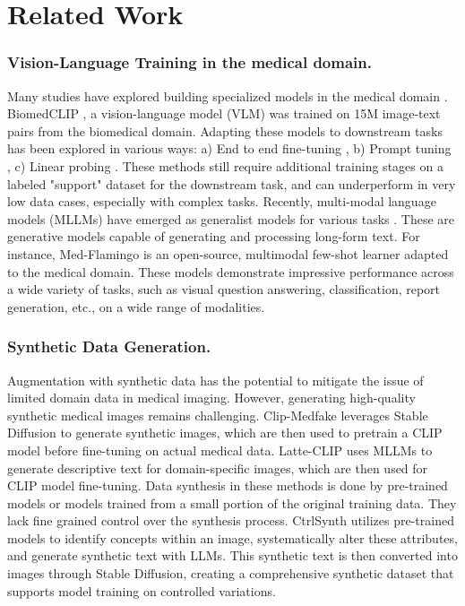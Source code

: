 \section{Related Work}
\subsubsection{Vision-Language Training in the medical domain.}
Many studies have explored building specialized models in the medical domain \cite{convirt, wang2022medclip, zhang2024mediclip}. BiomedCLIP \cite{zhang2023biomedclip}, a vision-language model (VLM) was trained on 15M image-text pairs from the biomedical domain. Adapting these models to downstream tasks has been explored in various ways: a) End to end fine-tuning \cite{convirt, ikezogwo2024quilt},  b) Prompt tuning \cite{coop2022, cocoop}, c) Linear probing \cite{radford2021learning, coop2022,shakeri2024few}.  These methods still require additional training stages on a labeled "support" dataset for the downstream task, and can underperform in very low data cases, especially with complex tasks.  
Recently, multi-modal language models (MLLMs) have emerged as generalist models for various tasks \cite{medflamingo,medpalm,llavamed}. These are generative models capable of generating and processing long-form text. For instance, Med-Flamingo \cite{medflamingo} is an open-source, multimodal few-shot learner adapted to the medical domain. These models demonstrate impressive performance across a wide variety of tasks, such as visual question answering, classification, report generation, etc., on a wide range of modalities.  


\subsubsection{Synthetic Data Generation.}

Augmentation with synthetic data has the potential to mitigate the issue of limited domain data in medical imaging. However, generating high-quality synthetic medical images remains challenging. Clip-Medfake \cite{medfake} leverages Stable Diffusion \cite{stablediffusion} to generate synthetic images, which are then used to pretrain a CLIP model before fine-tuning on actual medical data. Latte-CLIP \cite{cao2024latteclip} uses MLLMs to generate descriptive text for domain-specific images, which are then used for CLIP model fine-tuning. Data synthesis in these methods is done by pre-trained models or models trained from a small portion of the original training data.  They lack fine grained control over the synthesis process. CtrlSynth \cite{cao2024ctrlsynth} utilizes pre-trained models to identify concepts within an image, systematically alter these attributes, and generate synthetic text with LLMs. This synthetic text is then converted into images through Stable Diffusion, creating a comprehensive synthetic dataset that supports model training on controlled variations. 

